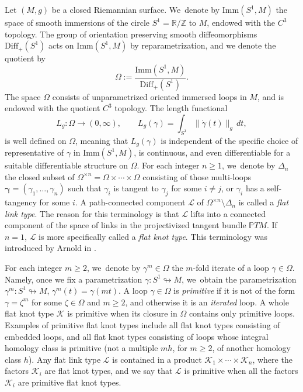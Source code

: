 \documentclass[JEP,XML,SOM,Unicode,NoFloatCountersInSection,published]{cedram}
\let\bm\boldsymbol
\newcommand{\Z}{\mathbb{Z}}
\newcommand{\R}{\mathbb{R}}
\newcommand{\PP}{\mathbb{P}}
\newcommand{\KK}{\mathcal{K}}
\newcommand{\LL}{\mathcal{L}}
\newcommand{\Diff}{\mathrm{Diff}}
\newcommand{\Imm}{\mathrm{Imm}}
\theoremstyle{plain}
\theoremstyle{definition}
\begin{document}
Let $(M,g)$ be a closed Riemannian surface. We~denote by $\Imm(S^1,M)$ the space of smooth immersions of the circle $S^1=\R/\Z$ to $M$, endowed with the $C^3$ topology. The group of orientation preserving smooth diffeomorphisms $\Diff_+(S^1)$ acts on $\Imm(S^1,M)$ by reparametrization, and we denote the quotient by
\[
\Omega:=\frac{\Imm(S^1,M)}{\Diff_+(S^1)}.
\]
The space $\Omega$ consists of unparametrized oriented immersed loops in $M$, and is endowed with the quotient $C^3$ topology.
The length functional
\[
L_g:\Omega\to(0,\infty),\qquad L_g(\gamma)=\int_{S^1} \|\dot\gamma(t)\|_g\,dt,
\]
is well defined on $\Omega$, meaning that $L_g(\gamma)$ is independent of the specific choice of representative of $\gamma$ in $\Imm(S^1,M)$, is continuous, and even differentiable for a suitable differentiable structure on $\Omega$.
For each integer $n\geq1$, we~denote by $\Delta_n$ the closed subset of $\Omega^{\times n}=\Omega\times\cdots\times\Omega$ consisting of those multi-loops $\bm\gamma=(\gamma_1,\dots,\gamma_n)$ such that $\gamma_i$ is tangent to $\gamma_j$ for some $i\neq j$, or $\gamma_i$ has a self-tangency for some $i$.
A path-connected component $\LL$ of $\Omega^{\times n}\setminus\Delta_n$ is called a \emph{flat link type}. The reason for this terminology is that $\LL$ lifts into a connected component of the space of links in the projectivized tangent bundle $\PP TM$. If $n=1$, $\LL$ is more specifically called a \emph{flat knot type}. This terminology was introduced by Arnold in \cite{Arnold:1994aa}.

For each integer $m\geq2$, we~denote by $\gamma^m\in\Omega$ the $m$-fold iterate of a loop $\gamma\in\Omega$. Namely, once we fix a parametrization $\gamma:S^1\looparrowright M$, we~obtain the parametrization $\gamma^m:S^1\looparrowright M$, $\gamma^m(t)=\gamma(mt)$.
A loop $\gamma\in\Omega$ is \emph{primitive} if it is not of the form $\gamma=\zeta^m$ for some $\zeta\in\Omega$ and $m\geq2$, and otherwise it is an \emph{iterated} loop.
A whole flat knot type $\KK$ is primitive when its closure in $\Omega$ contains only primitive loops. Examples of primitive flat knot types include all flat knot types consisting of embedded loops, and all flat knot types consisting of loops whose integral homology class is primitive (\ie not a multiple $mh$, for $m\geq2$, of another homology class $h$). Any flat link type $\LL$ is contained in a product $\KK_1\times\cdots\times\KK_n$, where the factors $\KK_i$ are flat knot types, and we say that $\LL$ is primitive when all the factors $\KK_i$ are primitive flat knot types.
\end{document}
